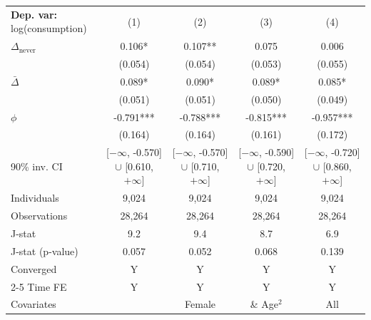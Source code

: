 \begin{tabular}{l cccc} \toprule  \textbf{Dep. var:}  log(consumption) 
                    &\multicolumn{1}{c}{(1)}   &\multicolumn{1}{c}{(2)}   &\multicolumn{1}{c}{(3)}   &\multicolumn{1}{c}{(4)}   \\

\addlinespace
$\Delta_{\text{never}}$&       0.106*  &       0.107** &       0.075   &       0.006   \\
                    &     (0.054)   &     (0.054)   &     (0.053)   &     (0.055)   \\

\addlinespace
$\bar{\Delta}$      &       0.089*  &       0.090*  &       0.089*  &       0.085*  \\
                    &     (0.051)   &     (0.051)   &     (0.050)   &     (0.049)   \\

\addlinespace
$\phi$              &      -0.791***&      -0.788***&      -0.815***&      -0.957***\\
                    &     (0.164)   &     (0.164)   &     (0.161)   &     (0.172)   \\
90\% inv. CI        &[$-\infty$, -0.570] $\cup$ [0.610, $+\infty$]   &[$-\infty$, -0.570] $\cup$ [0.710, $+\infty$]   &[$-\infty$, -0.590] $\cup$ [0.720, $+\infty$]   &[$-\infty$, -0.720] $\cup$ [0.860, $+\infty$]   \\
Individuals         &       9,024   &       9,024   &       9,024   &       9,024   \\
Observations        &      28,264   &      28,264   &      28,264   &      28,264   \\
J-stat              &         9.2   &         9.4   &         8.7   &         6.9   \\
J-stat (p-value)    &       0.057   &       0.052   &       0.068   &       0.139   \\
Converged           &           Y   &           Y   &           Y   &           Y   \\
\cmidrule{2-5} Time FE & Y & Y & Y & Y \\ Covariates & & Female & \& Age$^2$ & All \\ \bottomrule \end{tabular}
